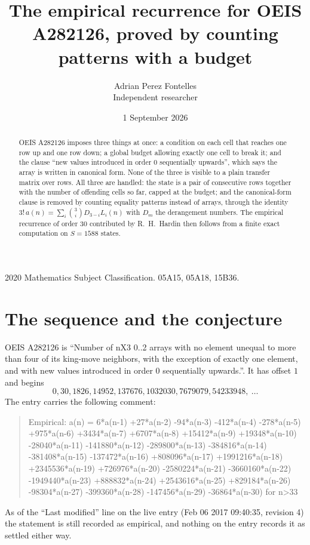 \documentclass[11pt,a4paper]{article}
\title{The empirical recurrence for OEIS A282126, proved by counting patterns with a budget}
\author{Adrian Perez Fontelles\\ \small Independent researcher}
\date{1 September 2026}
\theoremstyle{plain}
\theoremstyle{definition}
\begin{document}
\maketitle

\begin{abstract}
OEIS A282126 imposes three things at once: a condition on each cell that reaches one row up and
one row down; a global budget allowing exactly one cell to
break it; and the clause ``new values introduced in order $0$ sequentially upwards'', which
says the array is written in canonical form. None of the three is visible to a plain transfer
matrix over rows. All three are handled: the state is a pair of consecutive rows
together with the number of offending cells so far, capped at the budget; and the
canonical-form clause is removed by counting equality patterns instead of arrays, through the
identity $3!\,a(n)=\sum_i\binom{3}{i}D_{3-i}L_i(n)$ with $D_m$ the derangement
numbers. The empirical recurrence of order $30$ contributed by R.~H.~Hardin then follows
from a finite exact computation on $S=1588$ states.
\end{abstract}

\noindent\small 2020 Mathematics Subject Classification. 05A15, 05A18, 15B36.\normalsize

\section{The sequence and the conjecture}

OEIS A282126 is ``Number of nX3 0..2 arrays with no element unequal to more than four of its king-move neighbors, with the exception of exactly one element, and with new values introduced in order 0 sequentially upwards.''. It has offset $1$ and begins
\[
0, 30, 1826, 14952, 137676, 1032030, 7679079, 54233948,\ \dots
\]
The entry carries the following comment:
\begin{quote}\small
Empirical: a(n) = 6*a(n-1) +27*a(n-2) -94*a(n-3) -412*a(n-4) -278*a(n-5) +975*a(n-6) +3434*a(n-7) +6707*a(n-8) +15412*a(n-9) +19348*a(n-10) -28040*a(n-11) -141880*a(n-12) -289800*a(n-13) -384816*a(n-14) -381408*a(n-15) -137472*a(n-16) +808096*a(n-17) +1991216*a(n-18) +2345536*a(n-19) +726976*a(n-20) -2580224*a(n-21) -3660160*a(n-22) -1949440*a(n-23) +888832*a(n-24) +2543616*a(n-25) +829184*a(n-26) -98304*a(n-27) -399360*a(n-28) -147456*a(n-29) -36864*a(n-30) for n>33
\end{quote}
As of the ``Last modified'' line on the live entry (Feb 06 2017 09:40:35, revision 4) the statement is
still recorded as empirical, and nothing on the entry records it as settled either way.
\end{document}
